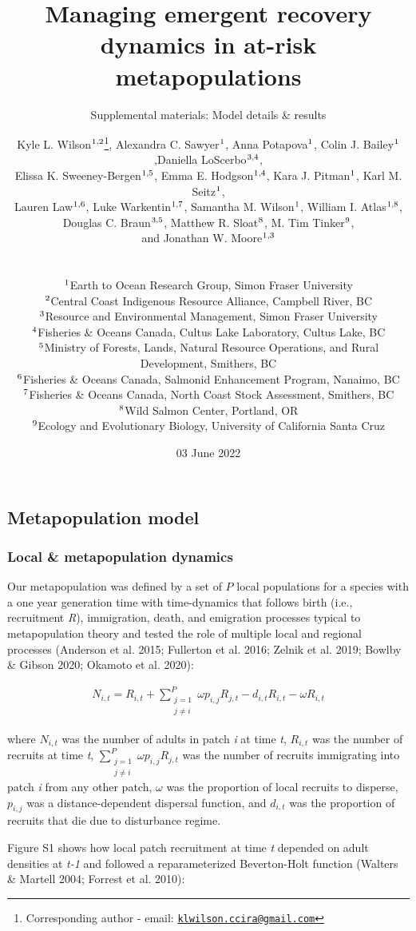 \documentclass[
]{article}
\title{Managing emergent recovery dynamics in at-risk metapopulations}
\subtitle{Supplemental materials: Model details \& results}
\author{Kyle L. Wilson\(^\textup{1,2}\)\footnote{Corresponding author -
  email:
  \href{mailto:klwilson.ccira@gmail.com}{\nolinkurl{klwilson.ccira@gmail.com}}},
Alexandra C. Sawyer\(^\textup{1}\), Anna Potapova\(^\textup{1}\), Colin
J. Bailey\(^\textup{1}\),Daniella LoScerbo\(^\textup{3,4}\),\\
Elissa K. Sweeney-Bergen\(^\textup{1,5}\), Emma E.
Hodgson\(^\textup{1,4}\), Kara J. Pitman\(^\textup{1}\), Karl M.
Seitz\(^\textup{1}\),\\
Lauren Law\(^\textup{1,6}\), Luke Warkentin\(^\textup{1,7}\), Samantha
M. Wilson\(^\textup{1}\), William I. Atlas\(^\textup{1,8}\),\\
Douglas C. Braun\(^\textup{3,5}\), Matthew R. Sloat\(^\textup{8}\), M.
Tim Tinker\(^\textup{9}\),\\
and Jonathan W. Moore\(^\textup{1,3}\)\\
\strut \\
\(^\textup{1}\)Earth to Ocean Research Group, Simon Fraser University\\
\(^\textup{2}\)Central Coast Indigenous Resource Alliance, Campbell
River, BC\\
\(^\textup{3}\)Resource and Environmental Management, Simon Fraser
University\\
\(^\textup{4}\)Fisheries \& Oceans Canada, Cultus Lake Laboratory,
Cultus Lake, BC\\
\(^\textup{5}\)Ministry of Forests, Lands, Natural Resource Operations,
and Rural Development, Smithers, BC\\
\(^\textup{6}\)Fisheries \& Oceans Canada, Salmonid Enhancement Program,
Nanaimo, BC\\
\(^\textup{7}\)Fisheries \& Oceans Canada, North Coast Stock Assessment,
Smithers, BC\\
\(^\textup{8}\)Wild Salmon Center, Portland, OR\\
\(^\textup{9}\)Ecology and Evolutionary Biology, University of
California Santa Cruz}
\date{03 June 2022}
\begin{document}
\maketitle

\centering
\raggedright
\renewcommand{\baselinestretch}{1}\normalsize
\tableofcontents
\renewcommand{\baselinestretch}{0.75}\normalsize
\newpage

\pagestyle{fancy}

\hypertarget{metapopulation-model}{%
\subsection{Metapopulation model}\label{metapopulation-model}}

\hypertarget{local-metapopulation-dynamics}{%
\subsubsection{Local \& metapopulation
dynamics}\label{local-metapopulation-dynamics}}

Our metapopulation was defined by a set of \(P\) local populations for a
species with a one year generation time with time-dynamics that follows
birth (i.e., recruitment \emph{R}), immigration, death, and emigration
processes typical to metapopulation theory and tested the role of
multiple local and regional processes (Anderson et al. 2015; Fullerton
et al. 2016; Zelnik et al. 2019; Bowlby \& Gibson 2020; Okamoto et al.
2020):

\begin{align}
N_{i,t}= R_{i,t}+{\sum\limits_{\substack{j=1 \\ j\neq i}}^{P} \omega p_{i,j}R_{j,t}}-d_{i,t}R_{i,t}-\omega R_{i,t}
\end{align}

where \(N_{i,t}\) was the number of adults in patch \emph{i} at time
\emph{t}, \(R_{i,t}\) was the number of recruits at time \emph{t},
\({\sum\limits_{\substack{j=1 \\ j\neq i}}^{P} \omega p_{i,j}R_{j,t}}\)
was the number of recruits immigrating into patch \emph{i} from any
other patch, \(\omega\) was the proportion of local recruits to
disperse, \(p_{i,j}\) was a distance-dependent dispersal function, and
\(d_{i,t}\) was the proportion of recruits that die due to disturbance
regime.

Figure S1 shows how local patch recruitment at time \emph{t} depended on
adult densities at \emph{t-1} and followed a reparameterized
Beverton-Holt function (Walters \& Martell 2004; Forrest et al. 2010):
\end{document}
